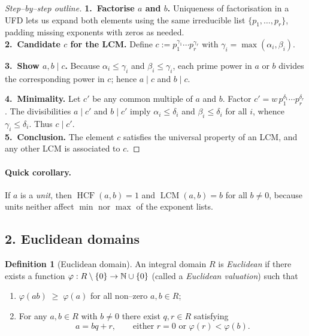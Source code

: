 \documentclass[12pt]{article}
\theoremstyle{definition} %
\newtheorem{definition}{Definition}
\theoremstyle{plain} %
\begin{document}
\begin{proof}[Step–by–step outline]
  \textbf{1.~Factorise \(a\) and \(b\).}\;
  Uniqueness of factorisation in a UFD lets us expand both elements using the
  same irreducible list \(\{p_{1},\dots,p_{r}\}\), padding missing exponents
  with zeros as needed.\\[-2pt]

  \textbf{2.~Candidate \(c\) for the LCM.}\;
  Define
  \(
       c := p_{1}^{\gamma_{1}}\cdots p_{r}^{\gamma_{r}}
  \)
  with \(\gamma_{i}=\max(\alpha_{i},\beta_{i})\).

  \textbf{3.~Show \(a,b\mid c\).}\;
  Because \(\alpha_{i}\le\gamma_{i}\) and \(\beta_{i}\le\gamma_{i}\),
  each prime power in \(a\) or \(b\) divides the corresponding power in \(c\);
  hence \(a\mid c\) and \(b\mid c\).

  \textbf{4.~Minimality.}\;
  Let \(c'\) be any common multiple of \(a\) and \(b\).
  Factor
  \(c' = w\,p_{1}^{\delta_{1}}\cdots p_{r}^{\delta_{r}}\).
  The divisibilities \(a\mid c'\) and \(b\mid c'\) imply
  \(\alpha_{i}\le\delta_{i}\) and \(\beta_{i}\le\delta_{i}\) for all \(i\),
  whence \(\gamma_{i}\le\delta_{i}\).
  Thus \(c\mid c'\).  \\[-2pt]

  \textbf{5.~Conclusion.}\;
  The element \(c\) satisfies the universal property of an LCM, and any other
  LCM is associated to \(c\).
\end{proof}

\paragraph{Quick corollary.}
If \(a\) is a \emph{unit}, then \(\operatorname{HCF}(a,b)=1\) and
\(\operatorname{LCM}(a,b)=b\) for all \(b\neq0\), because units neither
affect \(\min\) nor \(\max\) of the exponent lists.

\bigskip
\subsection*{2.  Euclidean domains}

\begin{definition}[Euclidean domain]
  An integral domain \(R\) is \emph{Euclidean} if there exists a function
  \(\varphi:R\setminus\{0\}\to\Bbb N\cup\{0\}\) (called a \emph{Euclidean
  valuation}) such that
  \begin{enumerate}
    \item \(\varphi(ab)\;\ge\;\varphi(a)\) for all non–zero \(a,b\in R\);
    \item For any \(a,b\in R\) with \(b\neq0\) there exist \(q,r\in R\) satisfying
          \[
             a = bq + r,
             \qquad
             \text{either } r = 0 \text{ or } \varphi(r)<\varphi(b).
          \]
  \end{enumerate}
\end{definition}
\end{document}
